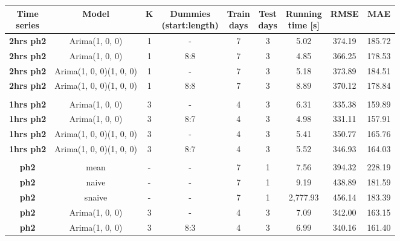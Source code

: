 \documentclass[12pt,a4paper,titlepage]{report}
\begin{document}
\begin{appendices}
\begin{table}[h]
    \begin{tabular}{|c|c|c|c|c|c|c|c|c|}
        \hline
        \makecell{\textbf{Time} \\ \textbf{series}} & \textbf{Model}          & \textbf{K} & \makecell{\textbf{Dummies} \\ \textbf{(start:length)}} & \makecell{\textbf{Train} \\ \textbf{days}} & \makecell{\textbf{Test}\\ \textbf{days}} & \makecell{\textbf{Running} \\ \textbf{time {[}s{]}}} & \textbf{RMSE} & \textbf{MAE} \\ \hline
        \textbf{2hrs ph2} & Arima(1, 0, 0)          & 1 & -   & 7 & 3 & 5.02     & 374.19 & 185.72 \\ \hline
        \textbf{2hrs ph2} & Arima(1, 0, 0)          & 1 & 8:8 & 7 & 3 & 4.85     & 366.25 & 178.53 \\ \hline
        \textbf{2hrs ph2} & Arima(1, 0, 0)(1, 0, 0) & 1 & -   & 7 & 3 & 5.18     & 373.89 & 184.51 \\ \hline
        \textbf{2hrs ph2} & Arima(1, 0, 0)(1, 0, 0) & 1 & 8:8 & 7 & 3 & 8.89     & 370.12 & 178.84 \\ \hline
        \textbf{}         &                         &   &     &   &   &          &        &        \\ \hline
        \textbf{1hrs ph2} & Arima(1, 0, 0)          & 3 & -   & 4 & 3 & 6.31     & 335.38 & 159.89 \\ \hline
        \textbf{1hrs ph2} & Arima(1, 0, 0)          & 3 & 8:7 & 4 & 3 & 4.98     & 331.11 & 157.91 \\ \hline
        \textbf{1hrs ph2} & Arima(1, 0, 0)(1, 0, 0) & 3 & -   & 4 & 3 & 5.41     & 350.77 & 165.76 \\ \hline
        \textbf{1hrs ph2} & Arima(1, 0, 0)(1, 0, 0) & 3 & 8:7 & 4 & 3 & 5.52     & 346.93 & 164.03 \\ \hline
        \textbf{}         &                         &   &     &   &   &          &        &        \\ \hline
        \textbf{ph2}      & mean                    & - & -   & 7 & 1 & 7.56     & 394.32 & 228.19 \\ \hline
        \textbf{ph2}      & naive                   & - & -   & 7 & 1 & 9.19     & 438.89 & 181.59 \\ \hline
        \textbf{ph2}      & snaive                  & - & -   & 7 & 1 & 2,777.93 & 456.14 & 183.39 \\ \hline
        \textbf{ph2}      & Arima(1, 0, 0)          & 3 & -   & 4 & 3 & 7.09     & 342.00 & 163.15 \\ \hline
        \textbf{ph2}      & Arima(1, 0, 0)          & 3 & 8:3 & 4 & 3 & 6.99     & 340.16 & 161.40 \\ \hline
    \end{tabular}
    

\end{table}
\end{appendices}
\end{document}
